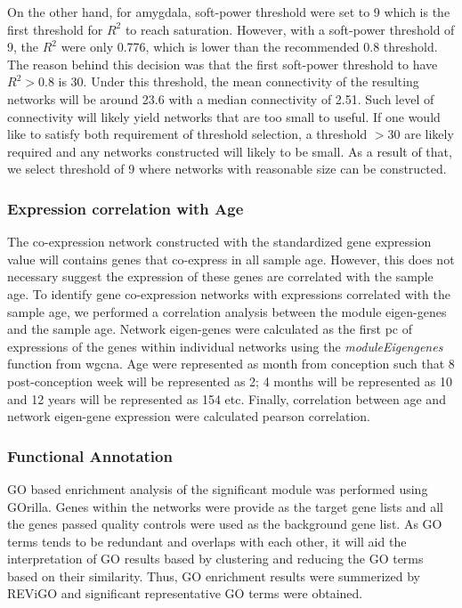 \documentclass{book}
\begin{document}
	On the other hand, for amygdala, soft-power threshold were set to 9 which is the first threshold for $R^2$ to reach saturation. 
	However, with a soft-power threshold of 9, the $R^2$ were only 0.776, which is lower than the recommended 0.8 threshold.
	The reason behind this decision was that the first soft-power threshold to have $R^2 > 0.8$ is 30.
	Under this threshold, the mean connectivity of the resulting networks will be around 23.6 with a median connectivity of 2.51.
	Such level of connectivity will likely yield networks that are too small to useful.
	If one would like to satisfy both requirement of threshold selection, a threshold $>30$ are likely required and any networks constructed will likely to be small.
	As a result of that, we select threshold of 9 where networks with reasonable size can be constructed.
	
	
	\subsubsection{Expression correlation with Age}
	The co-expression network constructed with the standardized gene expression value will contains genes that co-express in all sample age.
	However, this does not necessary suggest the expression of these genes are correlated with the sample age.
	To identify gene co-expression networks with expressions correlated with the sample age, we performed a correlation analysis between the module eigen-genes and the sample age. 
	Network eigen-genes were calculated as the first \gls{pc} of expressions of the genes within individual networks using the \emph{moduleEigengenes} function from \gls{wgcna}. 
	Age were represented as month from conception such that 8 post-conception week will be represented as 2; 4 months will be represented as 10 and 12 years will be represented as 154 etc. 
	Finally, correlation between age and network eigen-gene expression were calculated pearson correlation.
	
	\subsubsection{Functional Annotation}
	\gls{GO} based enrichment analysis of the significant module was performed using GOrilla\citep{Eden2009}.
	Genes within the networks were provide as the target gene lists and all the genes passed quality controls were used as the background gene list.
	As \gls{GO} terms tends to be redundant and overlaps with each other, it will aid the interpretation of \gls{GO} results based by clustering and reducing the \gls{GO} terms based on their similarity. 
	Thus, \gls{GO} enrichment results were summerized by REViGO\citep{Supek2011} and significant representative \gls{GO} terms were obtained.
	
\end{document}
